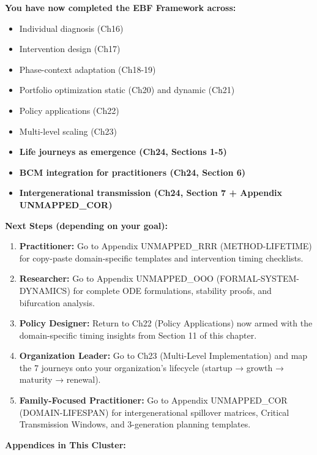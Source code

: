 {{{\begin{tcolorbox}[colback=green!5!white, colframe=green!75!black, title=Reading Path: What Comes Next?]
\textbf{You have now completed the EBF Framework across:}

\begin{itemize}[nosep]
\item Individual diagnosis (Ch16)
\item Intervention design (Ch17)
\item Phase-context adaptation (Ch18-19)
\item Portfolio optimization static (Ch20) and dynamic (Ch21)
\item Policy applications (Ch22)
\item Multi-level scaling (Ch23)
\item \textbf{Life journeys as emergence (Ch24, Sections 1-5)}
\item \textbf{BCM integration for practitioners (Ch24, Section 6)}
\item \textbf{Intergenerational transmission (Ch24, Section 7 + Appendix UNMAPPED_COR)}
\end{itemize}

\textbf{Next Steps (depending on your goal):}

\begin{enumerate}[nosep]
\item \textbf{Practitioner:} Go to Appendix UNMAPPED_RRR (METHOD-LIFETIME) for copy-paste domain-specific templates and intervention timing checklists.

\item \textbf{Researcher:} Go to Appendix UNMAPPED_OOO (FORMAL-SYSTEM-DYNAMICS) for complete ODE formulations, stability proofs, and bifurcation analysis.

\item \textbf{Policy Designer:} Return to Ch22 (Policy Applications) now armed with the domain-specific timing insights from Section 11 of this chapter.

\item \textbf{Organization Leader:} Go to Ch23 (Multi-Level Implementation) and map the 7 journeys onto your organization's lifecycle (startup → growth → maturity → renewal).

\item \textbf{Family-Focused Practitioner:} Go to Appendix UNMAPPED_COR (DOMAIN-LIFESPAN) for intergenerational spillover matrices, Critical Transmission Windows, and 3-generation planning templates.
\end{enumerate}

\textbf{Appendices in This Cluster:}


\end{tcolorbox}}}}
